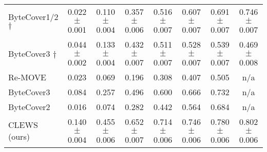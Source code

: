 \begin{table*}[h]
\begin{adjustbox}{max width=\textwidth}
\begin{sc}
\begin{tabular}{lccccccc}
ByteCover1/2 $\dag$ & 0.022 $\pm$ 0.001 & 0.110 $\pm$ 0.004 & 0.357 $\pm$ 0.006 & 0.516 $\pm$ 0.007 & 0.607 $\pm$ 0.007 & 0.691 $\pm$ 0.007 & 0.746 $\pm$ 0.007 \\
ByteCover3 $\dag$ & 0.044 $\pm$ 0.002 & 0.133 $\pm$ 0.004 & 0.432 $\pm$ 0.007 & 0.511 $\pm$ 0.007 & 0.528 $\pm$ 0.007 & 0.539 $\pm$ 0.007 & 0.469 $\pm$ 0.008 \\
Re-MOVE & 0.023 & 0.069 & 0.196 & 0.308 & 0.407 & 0.505 & n/a \\
ByteCover3 & 0.084 & 0.257 & 0.496 & 0.600 & 0.666 & 0.732 & n/a \\
ByteCover2 & 0.016 & 0.074 & 0.282 & 0.442 & 0.564 & 0.684 & n/a \\
CLEWS (ours) & 0.140 $\pm$ 0.004 & 0.455 $\pm$ 0.006 & 0.652 $\pm$ 0.007 & 0.714 $\pm$ 0.006 & 0.746 $\pm$ 0.006 & 0.780 $\pm$ 0.006 & 0.802 $\pm$ 0.006 \\
\bottomrule
\end{tabular}
\end{sc}
\end{adjustbox}
\end{table*}


